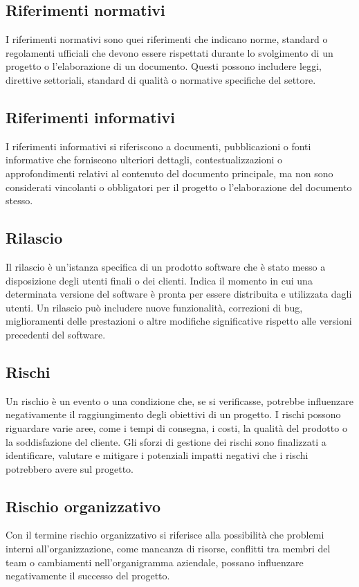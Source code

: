 \subsection*{Riferimenti normativi} 
I riferimenti normativi sono quei riferimenti che indicano norme, standard o regolamenti ufficiali che devono essere rispettati durante lo svolgimento di un progetto o l'elaborazione di un documento. Questi possono includere leggi, direttive settoriali, standard di qualità o normative specifiche del settore.
\subsection*{Riferimenti informativi} 
I riferimenti informativi si riferiscono a documenti, pubblicazioni o fonti informative che forniscono ulteriori dettagli, contestualizzazioni o approfondimenti relativi al contenuto del documento principale, ma non sono considerati vincolanti o obbligatori per il progetto o l'elaborazione del documento stesso.
\subsection*{Rilascio} 
Il rilascio è un'istanza specifica di un prodotto software che è stato messo a disposizione degli utenti finali o dei clienti. Indica il momento in cui una determinata versione del software è pronta per essere distribuita e utilizzata dagli utenti. Un rilascio può includere nuove funzionalità, correzioni di bug, miglioramenti delle prestazioni o altre modifiche significative rispetto alle versioni precedenti del software. 
\subsection*{Rischi} 
Un rischio è un evento o una condizione che, se si verificasse, potrebbe influenzare negativamente il raggiungimento degli obiettivi di un progetto. I rischi possono riguardare varie aree, come i tempi di consegna, i costi, la qualità del prodotto o la soddisfazione del cliente. Gli sforzi di gestione dei rischi sono finalizzati a identificare, valutare e mitigare i potenziali impatti negativi che i rischi potrebbero avere sul progetto. 
\subsection*{Rischio organizzativo} 
Con il termine rischio organizzativo si riferisce alla possibilità che problemi interni all'organizzazione, come mancanza di risorse, conflitti tra membri del team o cambiamenti nell'organigramma aziendale, possano influenzare negativamente il successo del progetto.
